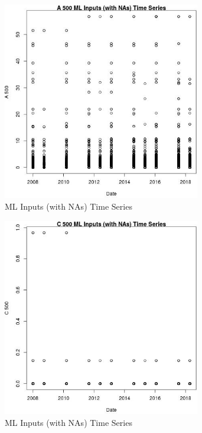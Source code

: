 \begin{figure} 
\centering  
\includegraphics[width=0.77\textwidth]{Code_Outputs/Report_ML_input_PM25_Step4_part_e_de_duplicated_aves_compiled_2019-05-18wNAs_A_500vDate.jpg} 
\caption{\label{fig:Report_ML_input_PM25_Step4_part_e_de_duplicated_aves_compiled_2019-05-18wNAsA_500vDate}ML Inputs (with NAs) Time Series} 
\end{figure} 
 

\begin{figure} 
\centering  
\includegraphics[width=0.77\textwidth]{Code_Outputs/Report_ML_input_PM25_Step4_part_e_de_duplicated_aves_compiled_2019-05-18wNAs_C_500vDate.jpg} 
\caption{\label{fig:Report_ML_input_PM25_Step4_part_e_de_duplicated_aves_compiled_2019-05-18wNAsC_500vDate}ML Inputs (with NAs) Time Series} 
\end{figure} 
 

